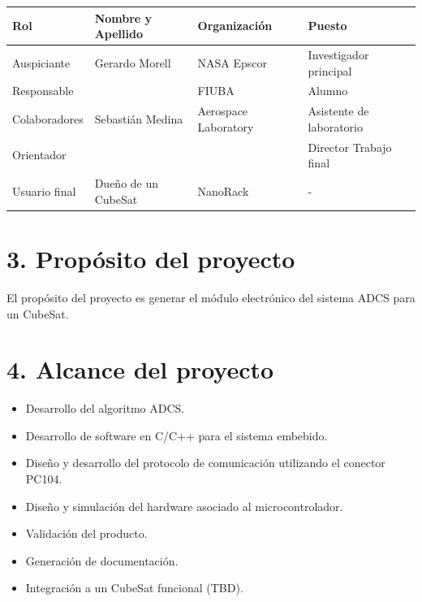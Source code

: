 \documentclass[
11pt, %
]{charter}
\begin{document}
\begin{table}[ht]
	\begin{tabularx}{\linewidth}{@{}|l|X|X|l|@{}}
		\hline
		\rowcolor[HTML]{C0C0C0} 
		Rol           & Nombre y Apellido & Organización 	& Puesto 	\\ \hline
		Auspiciante   &  Gerardo Morell    & NASA Epscor             	& Investigador principal  \\ \hline		
		Responsable   & \authorname       & FIUBA        	& Alumno 	\\ \hline
		Colaboradores & Sebastián Medina                   &  Aerospace Laboratory        	& Asistente de laboratorio       	\\ \hline
		Orientador    & \supname	      & \pertesupname 	& Director Trabajo final \\ \hline
		Usuario final & Dueño de un CubeSat     &      NanoRack        	&      -   	\\ \hline
	\end{tabularx}
\end{table}


\section{3. Propósito del proyecto}

	El propósito del proyecto es generar el módulo electrónico del sistema ADCS para un CubeSat. 

\section{4. Alcance del proyecto}
\label{sec:alcance}
\begin{itemize}
	\item Desarrollo del algoritmo ADCS. 
	\item Desarrollo de software en C/C++ para el sistema embebido. 
	\item Diseño y desarrollo del protocolo de comunicación utilizando el conector PC104.
	\item Diseño y simulación del hardware asociado al microcontrolador. 
	\item Validación del producto.
	\item Generación de documentación.  
	\item Integración a un CubeSat funcional (TBD).
\end{itemize}
	
\end{document}
